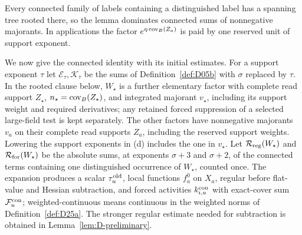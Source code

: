 Every connected family of labels containing a distinguished label has a spanning tree rooted there, so the lemma dominates connected sums of nonnegative majorants. In applications the factor $e^{\eta\operatorname{cov}_B(Z_a)}$ is paid by one reserved unit of support exponent.

We now give the connected identity with its initial estimates. For a support exponent $\tau$ let $\mathcal E_\tau,\mathcal K_\tau$ be the sums of Definition~\ref{def:D05b} with $\sigma$ replaced by $\tau$. In the rooted clause below, $W_\star$ is a further elementary factor with complete read support $Z_\star$, $n_\star=\operatorname{cov}_B(Z_\star)$, and integrated majorant $v_\star$, including its support weight and required derivatives; any retained forced suppression of a selected large-field test is kept separately. The other factors have nonnegative majorants $v_a$ on their complete read supports $Z_a$, including the reserved support weights. Lowering the support exponents in (d) includes the one in $v_\star$. Let $\mathcal R_{\rm reg}(W_\star)$ and $\mathcal R_{\rm for}(W_\star)$ be the absolute sums, at exponents $\sigma+3$ and $\sigma+2$, of the connected terms containing one distinguished occurrence of $W_\star$, counted once. The expansion produces a scalar $\tau_u^{\rm old}$, local functions $f_a^0$ on $X_a$, regular before flat-value and Hessian subtraction, and forced activities $k_{i,u}^{\rm con}$ with exact-cover sum $\mathcal F_u^{\rm con}$; weighted-continuous means continuous in the weighted norms of Definition~\ref{def:D25a}. The stronger regular estimate needed for subtraction is obtained in Lemma~\ref{lem:D-preliminary}.

